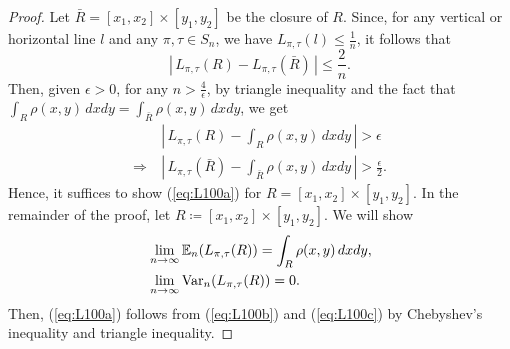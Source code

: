 \begin{proof}
Let $\bar{R} = [x_1, x_2]\times[y_1, y_2]$ be the closure of $R$. Since, for any vertical or horizontal line $l$ and any $\pi, \tau \in S_n$, we have $L_{\pi, \tau}(l) \le \frac{1}{n}$, it follows that
\[
\left|\,L_{\pi, \tau}(R) - L_{\pi, \tau}(\bar{R}) \, \right| \le \frac{2}{n}.
\]
Then, given $\epsilon > 0$, for any $n > \frac{4}{\epsilon}$, by triangle inequality and the fact that $\int_{R} \rho(x, y)\, dxdy = \int_{\bar{R}} \rho(x, y)\, dxdy$, we get
\begin{align*}
&\textstyle \left|\,L_{\pi, \tau}(R) - \int_{R} \rho(x, y)\, dxdy\, \right| > \epsilon\\
\Rightarrow \ &\textstyle\left|\,L_{\pi, \tau}(\bar{R}) - \int_{\bar{R}} \rho(x, y)\, dxdy\, \right| > \frac{\epsilon}{2}.
\end{align*}
Hence, it suffices to show (\ref{eq:L100a}) for $R = [x_1, x_2]\times[y_1, y_2]$. In the remainder of the proof, let $R \coloneqq [x_1, x_2]\times[y_1, y_2]$. We will show
\begin{align}
 &\lim_{n \to \infty}\mathbb{E}_n (L_{\pi, \tau}(R)) = \int_{R} \rho(x, y)\, dxdy,  \label{eq:L100b} \\
 &\lim_{n \to \infty}\text{Var}_n (L_{\pi, \tau}(R)) = 0.  \label{eq:L100c}
\end{align}
Then, (\ref{eq:L100a}) follows from (\ref{eq:L100b}) and (\ref{eq:L100c}) by Chebyshev's inequality and triangle inequality.



\end{proof}
